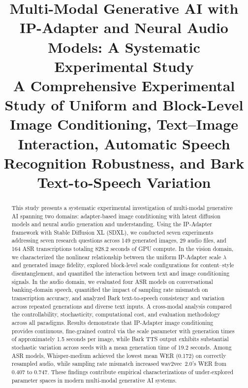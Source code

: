 \documentclass[conference]{IEEEtran}
\begin{document}

\title{Multi-Modal Generative AI with IP-Adapter and Neural Audio Models: A Systematic Experimental Study\\
{\footnotesize A Comprehensive Experimental Study of Uniform and Block-Level Image Conditioning, Text--Image Interaction, Automatic Speech Recognition Robustness, and Bark Text-to-Speech Variation}
}

\author{
}

\maketitle

\begin{abstract}
This study presents a systematic experimental investigation of multi-modal generative AI spanning two domains: adapter-based image conditioning with latent diffusion models and neural audio generation and understanding. Using the IP-Adapter framework with Stable Diffusion XL (SDXL), we conducted seven experiments addressing seven research questions across 149 generated images, 29 audio files, and 164 ASR transcriptions totaling 828.2 seconds of GPU compute. In the vision domain, we characterized the nonlinear relationship between the uniform IP-Adapter scale \(\lambda\) and generated image fidelity, explored block-level scale configurations for content--style disentanglement, and quantified the interaction between text and image conditioning signals. In the audio domain, we evaluated four ASR models on conversational banking-domain speech, quantified the impact of sampling rate mismatch on transcription accuracy, and analyzed Bark text-to-speech consistency and variation across repeated generations and diverse text inputs. A cross-modal analysis compared the controllability, stochasticity, computational cost, and evaluation methodology across all paradigms. Results demonstrate that IP-Adapter image conditioning provides continuous, fine-grained control via the scale parameter with generation times of approximately 1.5 seconds per image, while Bark TTS output exhibits substantial stochastic variation across seeds with a mean generation time of 19.2 seconds. Among ASR models, Whisper-medium achieved the lowest mean WER (0.172) on correctly resampled audio, while sampling rate mismatch increased wav2vec~2.0's WER from 0.407 to 0.747. These findings contribute empirical characterizations of under-explored parameter spaces in modern multi-modal generative AI systems.
\end{abstract}
\end{document}
